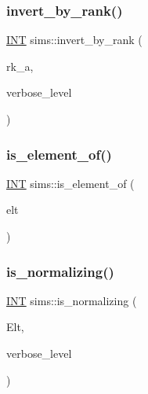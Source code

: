 \subsubsection{\texorpdfstring{invert\+\_\+by\+\_\+rank()}{invert\_by\_rank()}}
{\footnotesize\ttfamily \mbox{\hyperlink{galois_8h_a09fddde158a3a20bd2dcadb609de11dc}{I\+NT}} sims\+::invert\+\_\+by\+\_\+rank (\begin{DoxyParamCaption}\item[{\mbox{\hyperlink{galois_8h_a09fddde158a3a20bd2dcadb609de11dc}{I\+NT}}}]{rk\+\_\+a,  }\item[{\mbox{\hyperlink{galois_8h_a09fddde158a3a20bd2dcadb609de11dc}{I\+NT}}}]{verbose\+\_\+level }\end{DoxyParamCaption})}

\mbox{\label{classsims_a110f6a1c3b27159d76726309fb0bd748}} 
\subsubsection{\texorpdfstring{is\+\_\+element\+\_\+of()}{is\_element\_of()}}
{\footnotesize\ttfamily \mbox{\hyperlink{galois_8h_a09fddde158a3a20bd2dcadb609de11dc}{I\+NT}} sims\+::is\+\_\+element\+\_\+of (\begin{DoxyParamCaption}\item[{\mbox{\hyperlink{galois_8h_a09fddde158a3a20bd2dcadb609de11dc}{I\+NT}} $\ast$}]{elt }\end{DoxyParamCaption})}

\mbox{\label{classsims_a765233f627c6040b47d07b65ccb5529b}} 
\subsubsection{\texorpdfstring{is\+\_\+normalizing()}{is\_normalizing()}}
{\footnotesize\ttfamily \mbox{\hyperlink{galois_8h_a09fddde158a3a20bd2dcadb609de11dc}{I\+NT}} sims\+::is\+\_\+normalizing (\begin{DoxyParamCaption}\item[{\mbox{\hyperlink{galois_8h_a09fddde158a3a20bd2dcadb609de11dc}{I\+NT}} $\ast$}]{Elt,  }\item[{\mbox{\hyperlink{galois_8h_a09fddde158a3a20bd2dcadb609de11dc}{I\+NT}}}]{verbose\+\_\+level }\end{DoxyParamCaption})}

